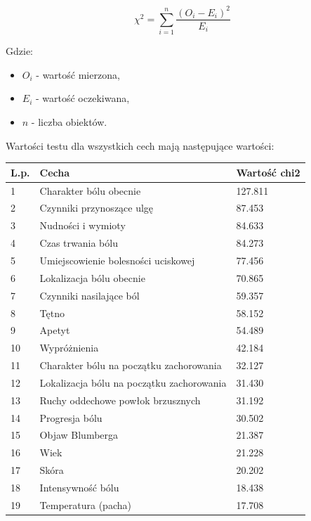\documentclass{report}
\begin{document}
    $$
    \chi ^ 2 = \sum_{i=1}^{n}{ \frac{{(O_i - E_i) ^ 2}}{E_i}}
    $$

    \noindent
    Gdzie:
    \begin{itemize}
        \item $O_i$ - wartość mierzona,
        \item $E_i$ - wartość oczekiwana,
        \item $n$ - liczba obiektów.
    \end{itemize}

    Wartości testu dla wszystkich cech mają następujące wartości:

    \vspace{1em}

    \begin{tabular}{|l|l|l|}
        \hline L.p. & Cecha & Wartość chi2 \\
        \hline 1 & Charakter bólu obecnie & 127.811 \\
        \hline 2 & Czynniki przynoszące ulgę & 87.453 \\
        \hline 3 & Nudności i wymioty & 84.633 \\
        \hline 4 & Czas trwania bólu & 84.273 \\
        \hline 5 & Umiejscowienie bolesności uciskowej & 77.456 \\
        \hline 6 & Lokalizacja bólu obecnie & 70.865 \\
        \hline 7 & Czynniki nasilające ból & 59.357 \\
        \hline 8 & Tętno & 58.152 \\
        \hline 9 & Apetyt & 54.489 \\
        \hline 10 & Wypróżnienia & 42.184 \\
        \hline 11 & Charakter bólu na początku zachorowania & 32.127 \\
        \hline 12 & Lokalizacja bólu na początku zachorowania & 31.430 \\
        \hline 13 & Ruchy oddechowe powłok brzusznych & 31.192 \\
        \hline 14 & Progresja bólu & 30.502 \\
        \hline 15 & Objaw Blumberga & 21.387 \\
        \hline 16 & Wiek & 21.228 \\
        \hline 17 & Skóra & 20.202 \\
        \hline 18 & Intensywność bólu & 18.438 \\
        \hline 19 & Temperatura (pacha) & 17.708 \\

\end{tabular}
\end{document}
